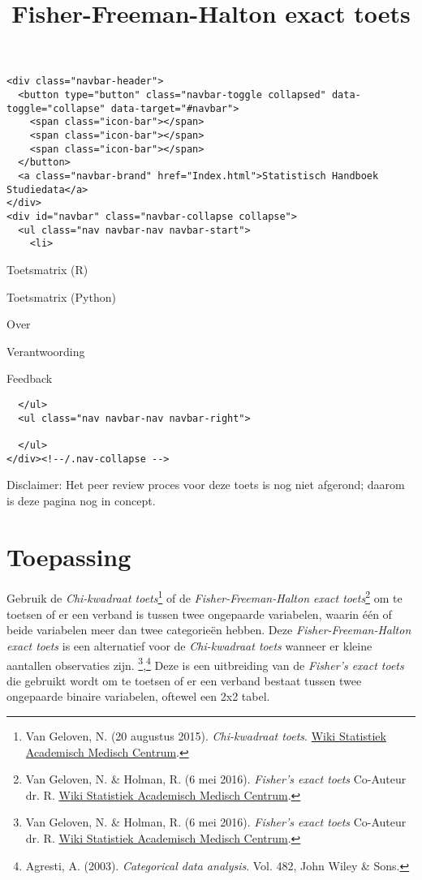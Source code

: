 \documentclass[
]{article}
\title{Fisher-Freeman-Halton exact toets}
\author{}
\date{\vspace{-2.5em}}
\begin{document}
\maketitle

{
\setcounter{tocdepth}{2}
\tableofcontents
}
\begin{verbatim}
<div class="navbar-header">
  <button type="button" class="navbar-toggle collapsed" data-toggle="collapse" data-target="#navbar">
    <span class="icon-bar"></span>
    <span class="icon-bar"></span>
    <span class="icon-bar"></span>
  </button>
  <a class="navbar-brand" href="Index.html">Statistisch Handboek Studiedata</a>
</div>
<div id="navbar" class="navbar-collapse collapse">
  <ul class="nav navbar-nav navbar-start">
    <li>
\end{verbatim}

Toetsmatrix (R)

Toetsmatrix (Python)

Over

Verantwoording

Feedback

\begin{verbatim}
  </ul>
  <ul class="nav navbar-nav navbar-right">

  </ul>
</div><!--/.nav-collapse -->
\end{verbatim}

Disclaimer: Het peer review proces voor deze toets is nog niet afgerond;
daarom is deze pagina nog in concept.

\hypertarget{toepassing}{%
\section{Toepassing}\label{toepassing}}

Gebruik de \emph{Chi-kwadraat toets}\footnote{Van Geloven, N. (20
  augustus 2015). \emph{Chi-kwadraat toets}.
  \href{https://wikistatistiek.amc.nl/index.php/Chi-kwadraat_toets}{Wiki
  Statistiek Academisch Medisch Centrum}.} of de
\emph{Fisher-Freeman-Halton exact toets}\footnote{Van Geloven, N. \&
  Holman, R. (6 mei 2016). \emph{Fisher's exact toets} Co-Auteur dr. R.
  \href{https://wikistatistiek.amc.nl/index.php/Fisher\%27s_exact_toets}{Wiki
  Statistiek Academisch Medisch Centrum}.} om te toetsen of er een
verband is tussen twee ongepaarde variabelen, waarin één of beide
variabelen meer dan twee categorieën hebben. Deze
\emph{Fisher-Freeman-Halton exact toets} is een alternatief voor de
\emph{Chi-kwadraat toets} wanneer er kleine aantallen observaties zijn.
\footnote{Van Geloven, N. \& Holman, R. (6 mei 2016). \emph{Fisher's
  exact toets} Co-Auteur dr. R.
  \href{https://wikistatistiek.amc.nl/index.php/Fisher\%27s_exact_toets}{Wiki
  Statistiek Academisch Medisch Centrum}.},\footnote{Agresti, A. (2003).
  \emph{Categorical data analysis}. Vol. 482, John Wiley \& Sons.} Deze
is een uitbreiding van de \emph{Fisher's exact toets} die gebruikt wordt
om te toetsen of er een verband bestaat tussen twee ongepaarde binaire
variabelen, oftewel een 2x2 tabel.
\end{document}
